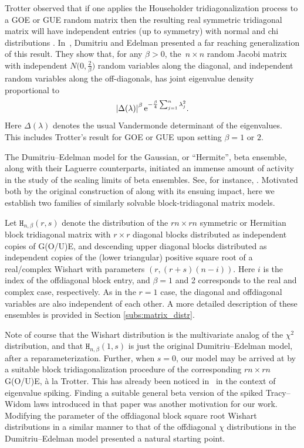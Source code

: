 \documentclass[pdftex]{sigma}
\numberwithin{equation}{section}
\theoremstyle{definition}
\newcommand{\HH}{\mathtt{H}_{n,\beta}}
\begin{document}
Trotter observed that if one applies the Householder tridiagonalization process to a GOE or GUE random matrix then the resulting real symmetric tridiagonal matrix will have independent entries (up to symmetry) with normal and chi distributions \cite{Trotter}. In~\cite{DE}, Dumitriu and Edelman presented a far reaching generalization of this result. They show that, for any $\beta > 0$, the~${ n \times n}$ random Jacobi matrix with independent $N\bigl(0,\frac{2}{\beta}\bigr)$ random variables along the diagonal, and independent  random variables along the off-diagonals, has joint eigenvalue density proportional to
\begin{equation}
\label{eig_DE}
\left|\Delta(\lambda)\right|^\beta {\rm e}^{-\frac{\beta}{4} \sum_{j=1}^n \lambda_j^2}.
\end{equation}
Here $\Delta(\lambda)$ denotes the usual Vandermonde determinant of the eigenvalues.
This includes Trotter's result for GOE or GUE upon setting $\beta=1$ or $2$.

The Dumitriu--Edelman model for the Gaussian, or ``Hermite'', beta ensemble, along with their Laguerre counterparts, initiated an immense amount of activity in the study of the scaling limits of beta ensembles. See, for instance,
\cite{ES, KillipNenciu,KS,KRV,RR, RRV,BVBV,BVBV_sbo}.
Motivated both by the original construction of \cite{DE} along with its ensuing impact, here we establish two families of similarly solvable block-tridiagonal matrix models.

Let $\HH (r,s)$ denote the distribution of the $rn \times rn$ symmetric or Hermitian block tridiagonal matrix with $r \times r$ diagonal blocks
distributed as independent copies of
G(O/U)E, and descending upper diagonal blocks distributed as independent copies of
the (lower triangular) positive square root of a real/complex Wishart with parameters $(r, (r+s)(n-i))$. Here $i$ is the index of the offdiagonal block entry, and
$\beta=1$ and 2 corresponds to the real and complex case, respectively.
As in the $r=1$ case, the diagonal and offdiagonal variables are also independent of each other. A more detailed description of these ensembles is provided in Section \ref{subs:matrix_distr}.

Note of course that the Wishart distribution is the multivariate analog of the $\chi^2$ distribution, and that $\HH(1,s)$ is just the original Dumitriu--Edelman model, after a reparameterization.
Further, when $s=0$, our model may be arrived at by a suitable block tridiagonalization procedure of the corresponding $rn \times rn$ G(O/U)E, {\`a} la Trotter. This has already been noticed in~\cite{Spike2} in the context of eigenvalue spiking. Finding a suitable general beta version of the spiked Tracy--Widom laws introduced in that paper was another motivation for our work. Modifying the parameter of the offdiagonal block square root Wishart distributions in a similar manner to that of the offdiagonal $\chi$ distributions in the Dumitriu--Edelman model presented a natural starting point.
\end{document}

